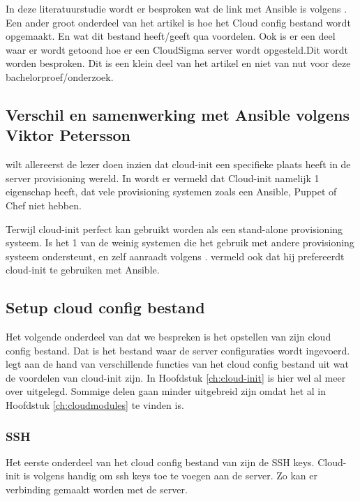 In deze literatuurstudie wordt er besproken wat de link met Ansible is volgens \autocite{viktorpet}. Een ander groot onderdeel van het artikel is hoe het Cloud config bestand wordt opgemaakt. En wat dit bestand heeft/geeft qua voordelen. Ook is er een deel waar er wordt getoond hoe er een CloudSigma server wordt opgesteld.Dit wordt worden besproken. Dit is een klein deel van het artikel en niet van nut voor deze bachelorproef/onderzoek.

\subsection{Verschil en samenwerking met Ansible volgens Viktor Petersson}
\autocite{viktorpet} wilt allereerst de lezer doen inzien dat cloud-init een specifieke plaats heeft in de server provisioning wereld. In \autocite{viktorpet} wordt er vermeld dat Cloud-init namelijk 1 eigenschap heeft, dat vele provisioning systemen zoals een Ansible, Puppet of Chef niet hebben. 

Terwijl cloud-init perfect kan gebruikt worden als een stand-alone provisioning systeem. Is het 1 van de weinig systemen die het gebruik met andere provisioning systeem ondersteunt, en zelf aanraadt volgens \autocite{viktorpet}. \autocite{viktorpet} vermeld ook dat hij prefereerdt cloud-init te gebruiken met Ansible.

\subsection{Setup cloud config bestand}
Het volgende onderdeel van \autocite{viktorpet} dat we bespreken is het opstellen van zijn cloud config bestand. Dat is het bestand waar de server configuraties wordt ingevoerd. \autocite{viktorpet} legt aan de hand van verschillende functies van het cloud config bestand uit wat de voordelen van cloud-init zijn. In Hoofdstuk \ref*{ch:cloud-init} is hier wel al meer over uitgelegd. Sommige delen gaan minder uitgebreid zijn omdat het al in Hoofdstuk \ref*{ch:cloudmodules} te vinden is.

\subsubsection{SSH}
Het eerste onderdeel van het cloud config bestand van \autocite{viktorpet} zijn de SSH keys. Cloud-init is volgens \autocite{viktorpet} handig om ssh keys toe te voegen aan de server. Zo kan er verbinding gemaakt worden met de server. 

